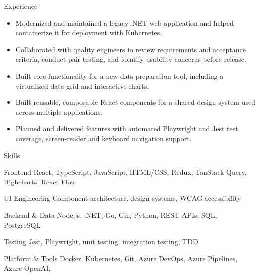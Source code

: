 \documentclass{resume} %
\begin{document}
\begin{rSection}{Experience}
    \begin{itemize}
        \item Modernized and maintained a legacy .NET web application and helped containerize it for deployment with Kubernetes.
        \item Collaborated with quality engineers to review requirements and acceptance criteria, conduct pair testing, and identify usability concerns before release.
        \item Built core functionality for a new data-preparation tool, including a virtualized data grid and interactive charts.
        \item Built reusable, composable React components for a shared design system used across multiple applications.
        \item Planned and delivered features with automated Playwright and Jest test coverage, screen-reader and keyboard navigation support.

    \end{itemize}
    \bigskip
\end{rSection}



\begin{rSection}{Skills}
    \setlength{\parskip}{0pt}

    \begin{rSubSection}{Frontend}
        React, TypeScript, JavaScript, HTML/CSS, Redux, TanStack Query, Highcharts, React Flow
    \end{rSubSection}
    \begin{rSubSection}{UI Engineering}
        Component architecture, design systems, WCAG accessibility
    \end{rSubSection}
    \begin{rSubSection}{Backend \& Data}
        Node.js, .NET, Go, Gin, Python, REST APIs, SQL, PostgreSQL
    \end{rSubSection}
    \begin{rSubSection}{Testing}
        Jest, Playwright, unit testing, integration testing, TDD
    \end{rSubSection}
    \begin{rSubSection}{Platform \& Tools}
        Docker, Kubernetes, Git, Azure DevOps, Azure Pipelines, Azure OpenAI,
    \end{rSubSection}

\end{rSection}
\end{document}
